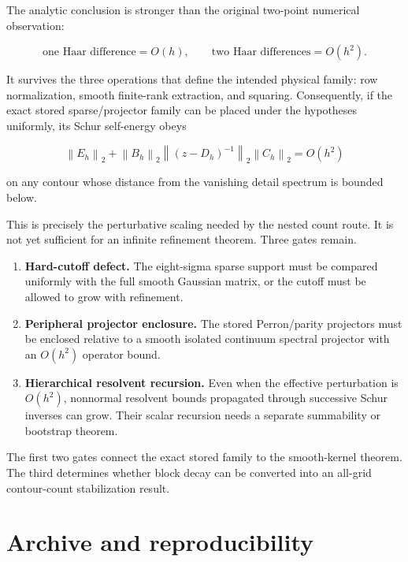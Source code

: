 \documentclass[11pt]{article}
\theoremstyle{definition}
\theoremstyle{remark}
\newcommand{\norm}[1]{\left\lVert #1\right\rVert}
\begin{document}
The analytic conclusion is stronger than the original two-point numerical
observation:

\begin{equation}
\boxed{
\text{one Haar difference}=O(h),\qquad
\text{two Haar differences}=O(h^2).
}
\label{eq:boxed-law}
\end{equation}

It survives the three operations that define the intended physical family:
row normalization, smooth finite-rank extraction, and squaring.  Consequently,
if the exact stored sparse/projector family can be placed under the hypotheses
uniformly, its Schur self-energy obeys

\[
\norm{E_h}_2+
\norm{B_h}_2\norm{(z-D_h)^{-1}}_2\norm{C_h}_2=O(h^2)
\]

on any contour whose distance from the vanishing detail spectrum is bounded
below.

This is precisely the perturbative scaling needed by the nested count route.
It is not yet sufficient for an infinite refinement theorem.  Three gates
remain.

\begin{enumerate}[leftmargin=2em]
 \item \textbf{Hard-cutoff defect.}  The eight-sigma sparse support must be
       compared uniformly with the full smooth Gaussian matrix, or the cutoff
       must be allowed to grow with refinement.
 \item \textbf{Peripheral projector enclosure.}  The stored Perron/parity
       projectors must be enclosed relative to a smooth isolated continuum
       spectral projector with an $O(h^2)$ operator bound.
 \item \textbf{Hierarchical resolvent recursion.}  Even when the effective
       perturbation is $O(h^2)$, nonnormal resolvent bounds propagated through
       successive Schur inverses can grow.  Their scalar recursion needs a
       separate summability or bootstrap theorem.
\end{enumerate}

The first two gates connect the exact stored family to the smooth-kernel
theorem.  The third determines whether block decay can be converted into an
all-grid contour-count stabilization result.

\section{Archive and reproducibility}
\label{sec:archive}
\end{document}

